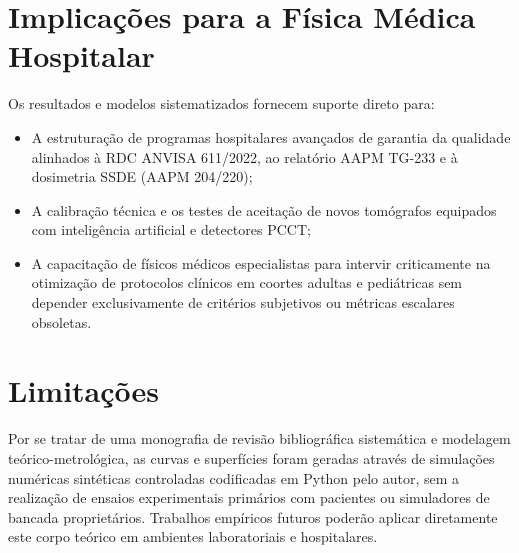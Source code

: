 \documentclass[
  12pt,
  a4paper,
  oneside
]{report}
\begin{document}
\section{Implicações para a Física Médica Hospitalar}
\label{sec:implicacoes_pratica_hospitalar}
Os resultados e modelos sistematizados fornecem suporte direto para:
\begin{itemize}
  \item A estruturação de programas hospitalares avançados de garantia da qualidade alinhados à RDC ANVISA 611/2022, ao relatório AAPM TG-233 e à dosimetria SSDE (AAPM 204/220);
  \item A calibração técnica e os testes de aceitação de novos tomógrafos equipados com inteligência artificial e detectores PCCT;
  \item A capacitação de físicos médicos especialistas para intervir criticamente na otimização de protocolos clínicos em coortes adultas e pediátricas sem depender exclusivamente de critérios subjetivos ou métricas escalares obsoletas.
\end{itemize}

\section{Limitações}
\label{sec:limitacoes_estudo_finais}
Por se tratar de uma monografia de revisão bibliográfica sistemática e modelagem teórico-metrológica, as curvas e superfícies foram geradas através de simulações numéricas sintéticas controladas codificadas em Python pelo autor, sem a realização de ensaios experimentais primários com pacientes ou simuladores de bancada proprietários. Trabalhos empíricos futuros poderão aplicar diretamente este corpo teórico em ambientes laboratoriais e hospitalares.
\end{document}
